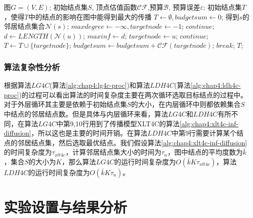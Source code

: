 \begin{algorithm}[H]
	\caption{$LDH4C(G, S, \mathcal{CF}, \mathcal{B})$}
	\label{alg:chap4:ldh4c-proc}
	\begin{algorithmic}[1]
	\REQUIRE 图$G=(V,E)$; 初始结点集$S$, 顶点估值函数$\mathcal{CF}$,预算$\mathcal{B}$, 预算误差$\varepsilon$;
	\ENSURE 初始结点集$T$，使得$T$中的结点的影响在图中能得到最大的传播
		\STATE $T \leftarrow \emptyset, budgetsum \leftarrow 0$;
			\STATE 得到$s$的邻居结点集合$\mathcal{N}(s)$;
			\STATE $maxdegree \leftarrow -\infty,targetnode \leftarrow -1$;
					\STATE $continue$;
				\ENDIF
				\STATE $d \leftarrow LENGTH(\mathcal{N}(u))$;
					\STATE $maxinf \leftarrow d$;
					\STATE $targetnode \leftarrow u$;
				\ENDIF
			\ENDFOR
				\STATE $continue$;
			\ENDIF
			\STATE $T \leftarrow T \cup \{targetnode\}$;
			\STATE $budgetsum \leftarrow budgetsum + \mathcal{CF}(targetnode)$;
				\STATE $break$;
			\ENDIF
		\ENDFOR
		\RETURN $T$;
	\end{algorithmic}
\end{algorithm}

\subsubsection{算法复杂性分析}
根据算法$LG4C$(算法\ref{alg:chap4:lg4c-proc})和算法$LDH4C$(算法\ref{alg:chap4:ldh4c-proc})的过程可以看出算法的时间复杂度主要在两次循环选取目标结点的过程中。对于外层循环其主要是依赖于初始结点集$S$的大小，在内层循环中则都依赖集合$S$中结点的邻居结点数。但是具体与内层循环来看，算法$LG4C$和$LDH4C$有所不同，在算法$LG4C$中第9,10行用到了传播模型XLT4C的算法\ref{alg:chap4:xlt4c-inf-diffusion}，所以这也是主要的时间开销。在算法$LDH4C$中第9行需要计算某个结点的邻居结点集，然后选取最优结点。我们假设算法\ref{alg:chap4:xlt4c-inf-diffusion}的时间复杂度为$\tau_{xlt4c}$，计算邻居结点集大小的时间为$\tau_{n}$，图中结点的平均度数为$\bar{k}$，集合$S$的大小为$K$，那么算法$LG4C$的运行时间复杂度为$O(\bar{k}K\tau_{xlt4c})$，算法$LDH4C$的运行时间复杂度为$O(\bar{k}K\tau_{n})$。

\section{实验设置与结果分析}

